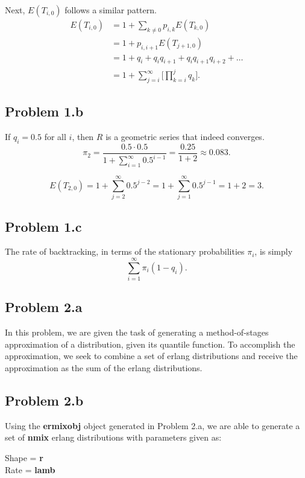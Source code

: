 \documentclass[letter]{article}
\begin{document}
Next, $E(T_{i,0})$ follows a similar pattern. 
\begin{equation*}
  \begin{aligned}
      E(T_{i,0}) &= 1 + \sum_{k \ne 0}{p_{i,k}E(T_{k,0})} \\ 
                 &= 1 + p_{i,i+1}E(T_{j+1,0}) \\
                 &= 1 + q_i + q_iq_{i+1} + q_iq_{i+1}q_{i+2} + \dots \\
                 &= 1 + \sum_{j=i}^\infty{\Big[ \prod_{k=i}^{j}{q_k} \Big]}.
  \end{aligned}
\end{equation*}


\subsection*{Problem 1.b}
If $q_i = 0.5$ for all $i$, then $R$ is a geometric series that indeed converges. 
$$ \pi_2 = \frac{0.5 \cdot 0.5}{1 + \sum_{i=1}^\infty{0.5^{i-1}}} = 
           \frac{0.25}{1+2} \approx 0.083. $$

$$ E(T_{2,0}) = 1 + \sum_{j=2}^\infty{0.5^{j-2}} 
              = 1 + \sum_{j=1}^\infty{0.5^{j-1}} = 1 + 2 = 3. $$

\subsection*{Problem 1.c}
The rate of backtracking, in terms of the stationary probabilities $\pi_i$, is simply
$$ \sum_{i=1}^\infty{\pi_i(1 - q_i)}. $$


\subsection*{Problem 2.a}
    In this problem, we are given the task of generating a method-of-stages approximation of a distribution, given its quantile function.  To accomplish the approximation, we seek to combine a set of erlang distributions and receive the approximation as the sum of the erlang distributions.

\subsection*{Problem 2.b}

    Using the \textbf{ermixobj} object generated in Problem 2.a, we are able to generate a set of \textbf{nmix} erlang distributions with
parameters given as:\\
\begin{center}
\large{
Shape = \textbf{r}\\
Rate = \textbf{lamb}\\
}
\end{center}
  
\end{document}

